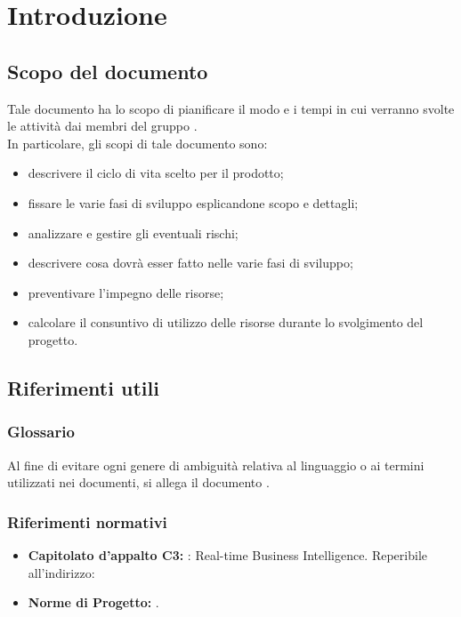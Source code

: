 \section{Introduzione}

	\subsection{Scopo del documento}
		Tale documento ha lo scopo di pianificare il modo e i tempi in cui verranno svolte le attività dai membri del gruppo \groupname{}.\\
		In particolare, gli scopi di tale documento sono:
		\begin{itemize}
			\item descrivere il ciclo di vita scelto per il prodotto;
			\item fissare le varie fasi di sviluppo esplicandone scopo e dettagli;
			\item analizzare e gestire gli eventuali rischi;
			\item descrivere cosa dovrà esser fatto nelle varie fasi di sviluppo;
			\item preventivare l'impegno delle risorse;
			\item calcolare il consuntivo di utilizzo delle risorse durante lo svolgimento del progetto.
		\end{itemize}
	
		

	\subsection{Riferimenti utili}
		\subsubsection{Glossario}
		Al fine di evitare ogni genere di ambiguità relativa al linguaggio o ai termini utilizzati nei documenti, si allega il documento .
		\subsubsection{Riferimenti normativi}
			\begin{itemize}
				\item\textbf{Capitolato d'appalto C3:} \projectname{}: Real-time Business Intelligence. Reperibile all'indirizzo: 
				\item\textbf{Norme di Progetto:} .
			\end{itemize}
